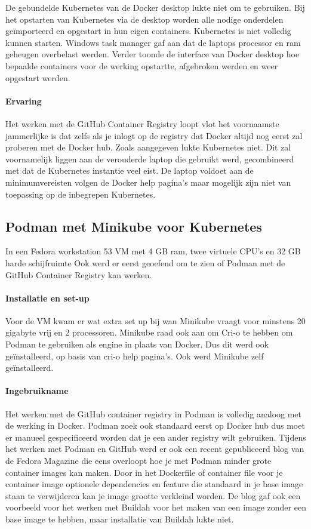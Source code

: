 \begin{itemize}
De gebundelde Kubernetes van de Docker desktop lukte niet om te gebruiken. Bij het opstarten van Kubernetes via de desktop worden alle nodige onderdelen geïmporteerd en opgestart in hun eigen containers. Kubernetes is niet volledig kunnen starten. Windows task manager gaf aan dat de laptops processor en ram geheugen overbelast werden. Verder toonde de interface van Docker desktop hoe bepaalde containers voor de werking opstartte, afgebroken werden en weer opgestart werden.

\paragraph{Ervaring}
Het werken met de GitHub Container Registry loopt vlot het voornaamste jammerlijke is dat zelfs als je inlogt op de registry dat Docker altijd nog eerst zal proberen met de Docker hub.
Zoals aangegeven lukte Kubernetes niet. Dit zal voornamelijk liggen aan de verouderde laptop die gebruikt werd, gecombineerd met dat de Kubernetes instantie veel eist. De laptop voldoet aan de minimumvereisten volgen de Docker help pagina’s maar mogelijk zijn niet van toepassing op de inbegrepen Kubernetes.  


\subsection{Podman met Minikube voor Kubernetes}
In een Fedora workstation 53 VM met 4 GB ram, twee virtuele CPU’s en 32 GB harde schijfruimte Ook werd er eerst geoefend om te zien of Podman met de GitHub Container Registry kan werken.
\paragraph{Installatie en set-up}
Voor de VM kwam er wat extra set up bij wan Minikube vraagt voor minstens 20 gigabyte vrij en 2 processoren.
Minikube raad ook aan om Cri-o te hebben om Podman te gebruiken als engine in plaats van Docker. Dus dit werd ook geïnstalleerd, op basis van cri-o help pagina’s.  Ook werd Minikube zelf geïnstalleerd.

\paragraph{Ingebruikname}
Het werken met de GitHub container registry in Podman is volledig analoog met de werking in Docker. Podman zoek ook standaard eerst op Docker hub dus moet er manueel gespecificeerd worden dat je een ander registry wilt gebruiken. Tijdens het werken met Podman en GitHub werd er ook een recent gepubliceerd blog van de Fedora Magazine die eens overloopt hoe je met Podman minder grote container images kan maken. Door in het Dockerfile of container file voor je container image optionele dependencies en feature die standaard in je base image staan te verwijderen kan je image grootte verkleind worden. De blog gaf ook een voorbeeld voor het werken met Buildah voor het maken van een image zonder een base image te hebben, maar installatie van Buildah lukte niet.


\end{itemize}
